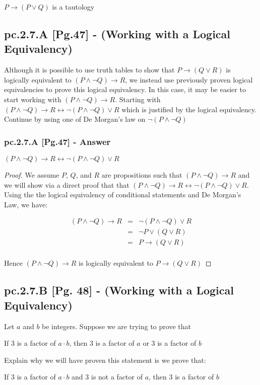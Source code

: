 $P \to (P \vee Q)$ is a tautology \\


\subsection{pc.2.7.A [Pg.47] - (Working with a Logical Equivalency)}

Although it is possible to use truth tables to show that $P \to (Q \vee R)$ is logically equivalent to $(P \wedge \neg Q) \to R$, we instead use previously proven logical equivalencies to prove this logical equivalency. In this case, it may be easier to start working with $(P \wedge \neg Q) \to R$. Starting with $(P \wedge \neg Q) \to R \leftrightarrow \neg (P \wedge \neg Q) \vee R$ which is justified by the logical equivalency. Continue by using one of De Morgan's law on $\neg (P \wedge \neg Q)$ \\ 

\subsubsection*{pc.2.7.A [Pg.47] - Answer}

\begin{tcolorbox}
\begin{theorem}
$(P \wedge \neg Q) \to R \leftrightarrow \neg (P \wedge \neg Q) \vee R$
\end{theorem}
\end{tcolorbox}

\begin{proof}
We assume $P$, $Q$, and $R$ are propositions such that $(P \wedge \neg Q) \to R$ and we will show via a direct proof that that $(P \wedge \neg Q) \to R \leftrightarrow \neg (P \wedge \neg Q) \vee R$. Using the the logical equivalency of conditional statements and De Morgan's Law, we have: 

\begin{eqnarray}
(P \wedge \neg Q) \to R & = & \neg (P \wedge \neg Q) \vee R \nonumber \\
& = & \neg P \vee (Q \vee R) \nonumber \\
& = & P \to (Q \vee R) \nonumber \\
\end{eqnarray}

Hence $(P \wedge \neg Q) \to R$ is logically equivalent to $P \to (Q \vee R)$
\end{proof}

\newpage
\subsection*{pc.2.7.B [Pg. 48] - (Working with a Logical Equivalency)}
Let $a$ and $b$ be integers. Suppose we are trying to prove that 
	\begin{center}
		If $3$ is a factor of $a \cdot b$, then $3$ is a factor of $a$ or $3$ is a factor of $b$
	\end{center} 
Explain why we will have proven this statement is we prove that:
	\begin{center}		
		If $3$ is a factor of $a \cdot b$ and $3$ is not a factor of $a$, then $3$ is a factor of $b$
	\end{center}


